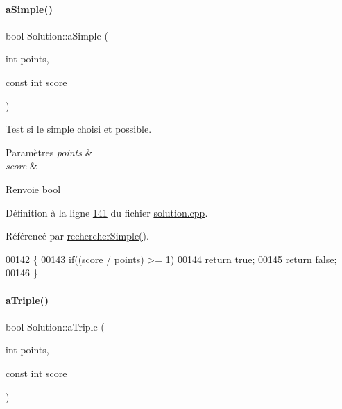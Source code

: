 \paragraph{\texorpdfstring{a\+Simple()}{aSimple()}}
{\footnotesize\ttfamily bool Solution\+::a\+Simple (\begin{DoxyParamCaption}\item[{int}]{points,  }\item[{const int}]{score }\end{DoxyParamCaption})\hspace{0.3cm}{\ttfamily [private]}}



Test si le simple choisi et possible. 


\begin{DoxyParams}{Paramètres}
{\em points} & \\
\hline
{\em score} & \\
\hline
\end{DoxyParams}
\begin{DoxyReturn}{Renvoie}
bool 
\end{DoxyReturn}


Définition à la ligne \hyperlink{solution_8cpp_source_l00141}{141} du fichier \hyperlink{solution_8cpp_source}{solution.\+cpp}.



Référencé par \hyperlink{solution_8cpp_source_l00156}{rechercher\+Simple()}.


\begin{DoxyCode}
00142 \{
00143     \textcolor{keywordflow}{if}((score / points) >= 1)
00144         \textcolor{keywordflow}{return} \textcolor{keyword}{true};
00145     \textcolor{keywordflow}{return} \textcolor{keyword}{false};
00146 \}
\end{DoxyCode}
\mbox{\label{class_solution_af8062e8e2997f8a7451e439ce23dd544}} 
\paragraph{\texorpdfstring{a\+Triple()}{aTriple()}}
{\footnotesize\ttfamily bool Solution\+::a\+Triple (\begin{DoxyParamCaption}\item[{int}]{points,  }\item[{const int}]{score }\end{DoxyParamCaption})\hspace{0.3cm}{\ttfamily [private]}}



